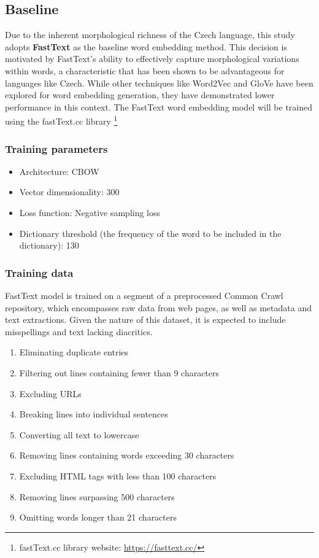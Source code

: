 \subsection{Baseline}
Due to the inherent morphological richness of the Czech language, this study adopts \textbf{FastText} as the baseline word embedding method.
This decision is motivated by FastText's ability to effectively capture morphological variations within words, a characteristic that has been shown to be advantageous for languages like Czech.
While other techniques like Word2Vec and \ac{GloVe} have been explored for word embedding generation, they have demonstrated lower performance in this context.
The FastText word embedding model will be trained using the fastText.cc library \footnote{fastText.cc library website: \url{https://fasttext.cc/}}

\subsubsection{Training parameters}
\begin{itemize}
  \item Architecture: \ac{CBOW} 
  \item Vector dimensionality: 300
  \item Loss function: Negative sampling loss
  \item Dictionary threshold (the frequency of the word to be included in the dictionary): 130
\end{itemize}

\subsubsection{Training data}

FastText model is trained on a segment of a preprocessed Common Crawl repository, which encompasses raw data from web pages, as well as metadata and text extractions.
Given the nature of this dataset, it is expected to include misspellings and text lacking diacritics.

\begin{enumerate}
  \item Eliminating duplicate entries
  \item Filtering out lines containing fewer than 9 characters
  \item Excluding URLs
  \item Breaking lines into individual sentences
  \item Converting all text to lowercase
  \item Removing lines containing words exceeding 30 characters
  \item Excluding HTML tags with less than 100 characters
  \item Removing lines surpassing 500 characters
  \item Omitting words longer than 21 characters
\end{enumerate}

